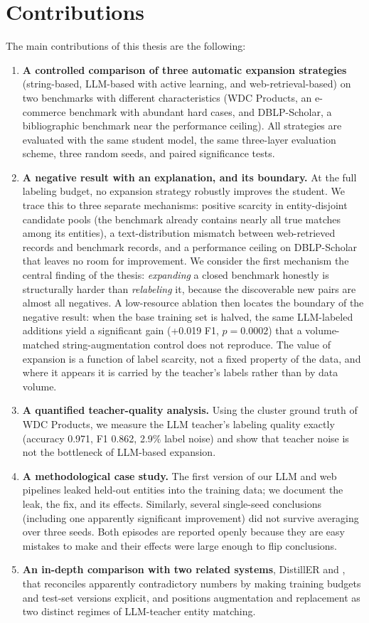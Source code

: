 \documentclass[a4paper,oneside,bibliography=totoc]{scrbook}
\begin{document}
\section{Contributions}
\label{sec:contributions}

The main contributions of this thesis are the following:

\begin{enumerate}
\item \textbf{A controlled comparison of three automatic expansion strategies} (string-based, LLM-based with active learning, and web-retrieval-based) on two benchmarks with different characteristics (WDC Products, an e-commerce benchmark with abundant hard cases, and DBLP-Scholar, a bibliographic benchmark near the performance ceiling). All strategies are evaluated with the same student model, the same three-layer evaluation scheme, three random seeds, and paired significance tests.
\item \textbf{A negative result with an explanation, and its boundary.} At the full labeling budget, no expansion strategy robustly improves the student. We trace this to three separate mechanisms: positive scarcity in entity-disjoint candidate pools (the benchmark already contains nearly all true matches among its entities), a text-distribution mismatch between web-retrieved records and benchmark records, and a performance ceiling on DBLP-Scholar that leaves no room for improvement. We consider the first mechanism the central finding of the thesis: \emph{expanding} a closed benchmark honestly is structurally harder than \emph{relabeling} it, because the discoverable new pairs are almost all negatives. A low-resource ablation then locates the boundary of the negative result: when the base training set is halved, the same LLM-labeled additions yield a significant gain (+0.019 F1, $p = 0.0002$) that a volume-matched string-augmentation control does not reproduce. The value of expansion is a function of label scarcity, not a fixed property of the data, and where it appears it is carried by the teacher's labels rather than by data volume.
\item \textbf{A quantified teacher-quality analysis.} Using the cluster ground truth of WDC Products, we measure the LLM teacher's labeling quality exactly (accuracy 0.971, F1 0.862, 2.9\% label noise) and show that teacher noise is not the bottleneck of LLM-based expansion.
\item \textbf{A methodological case study.} The first version of our LLM and web pipelines leaked held-out entities into the training data; we document the leak, the fix, and its effects. Similarly, several single-seed conclusions (including one apparently significant improvement) did not survive averaging over three seeds. Both episodes are reported openly because they are easy mistakes to make and their effects were large enough to flip conclusions.
\item \textbf{An in-depth comparison with two related systems}, DistillER and \citet{steiner2026labeling}, that reconciles apparently contradictory numbers by making training budgets and test-set versions explicit, and positions augmentation and replacement as two distinct regimes of LLM-teacher entity matching.
\end{enumerate}
\end{document}

